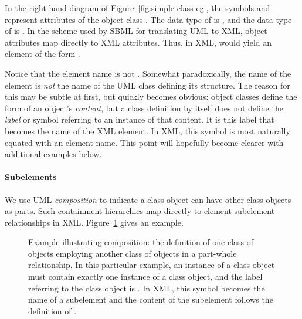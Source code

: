 In the right-hand diagram of Figure~\ref{fig:simple-class-eg}, the
symbols  and  represent
attributes of the object class .  The data
type of  is , and the data type of
 is .  In the scheme used
by SBML for translating UML to XML, object attributes map directly
to XML attributes.  Thus, in XML,  would yield
an element of the form .

Notice that the element name is not .
Somewhat paradoxically, the name of the element is \emph{not} the
name of the UML class defining its structure.  The reason for this
may be subtle at first, but quickly becomes obvious: object
classes define the form of an object's \emph{content}, but a class
definition by itself does not define the \emph{label} or symbol
referring to an instance of that content.  It is this label that
becomes the name of the XML element.  In XML, this symbol is most
naturally equated with an element name.  This point will hopefully
become clearer with additional examples below.


\paragraph{Subelements}

We use UML \emph{composition} to indicate a class object can
have other class objects as parts.  Such containment hierarchies
map directly to element-subelement relationships in XML.
Figure~\ref{fig:subelement-eg} gives an example.

\begin{figure}[htb]
  \centering
  \small
  \caption{Example illustrating composition: the definition of one
    class of objects employing another class of objects in a
    part-whole relationship.  In this particular example, an
    instance of a  class object must contain exactly
    one instance of a  class object, and the label
    referring to the  class object is .
    In XML, this symbol becomes the name of a subelement and the
    content of the subelement follows the definition of
    .}
  \label{fig:subelement-eg}
\end{figure}

